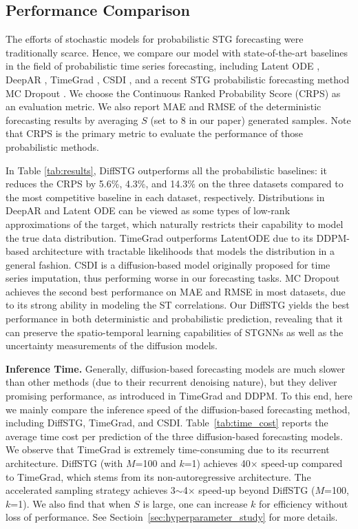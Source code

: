{\subsection{Performance Comparison} 

\par The efforts of stochastic models for probabilistic STG forecasting were traditionally scarce. Hence, we compare our model with state-of-the-art baselines in the field of probabilistic time series forecasting, including Latent ODE \cite{rubanova2019latent}, DeepAR \cite{salinas2020deepar}, TimeGrad \cite{rasul2021autoregressive}, CSDI \cite{tashiro2021csdi}, and a recent STG probabilistic forecasting method MC Dropout \cite{wu2021quantifying}. We choose the Continuous Ranked Probability Score (CRPS) \cite{matheson1976scoring} as an evaluation metric. We also report MAE and RMSE of the deterministic forecasting results by averaging $S$ (set to $8$ in our paper) generated samples. Note that CRPS is the primary metric to evaluate the performance of those probabilistic methods. 

\par In Table \ref{tab:results}, DiffSTG outperforms all the probabilistic baselines: it reduces the CRPS by 5.6\%, 4.3\%, and 14.3\% on the three datasets compared to the most competitive baseline in each dataset, respectively. Distributions in DeepAR and Latent ODE can be viewed as some types of low-rank approximations of the target, which naturally restricts their capability to model the true data distribution. TimeGrad outperforms LatentODE due to its DDPM-based architecture with tractable likelihoods that models the distribution in a general fashion. CSDI is a diffusion-based model originally proposed for time series imputation, thus performing worse in our forecasting tasks. MC Dropout achieves the second best performance on MAE and RMSE in most datasets, due to its strong ability in modeling the ST correlations. Our DiffSTG yields the best performance in both deterministic and probabilistic prediction, revealing that it can preserve the spatio-temporal learning capabilities of STGNNs as well as the uncertainty measurements of the diffusion models.

\textbf{Inference Time.} Generally, diffusion-based forecasting models are much slower than other methods (due to their recurrent denoising nature), but they deliver promising performance, as introduced in TimeGrad and DDPM. To this end, here we mainly compare the inference speed of the diffusion-based forecasting method, including DiffSTG, TimeGrad, and CSDI. Table~\ref{tab:time_cost} reports the average time cost per prediction of the three diffusion-based forecasting models. We observe that TimeGrad is extremely time-consuming due to its recurrent architecture. DiffSTG (with $M$=100 and $k$=1) achieves 40$\times$ speed-up compared to TimeGrad, which stems from its non-autoregressive architecture. The accelerated sampling strategy achieves 3$\sim$4$\times$ speed-up beyond DiffSTG ($M$=100, $k$=1). We also find that when $S$ is large, one can increase $k$ for efficiency without loss of performance. See Sectioin~\ref{sec:hyperparameter_study} for more details. 

}
